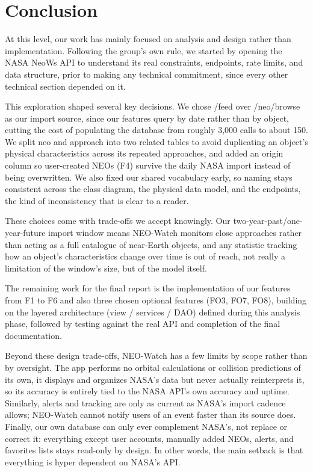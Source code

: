 \section{Conclusion}
At this level, our work has mainly focused on analysis and design rather than implementation. Following the group's own rule, we started by opening the NASA NeoWs API to understand its real constraints, endpoints, rate limits, and data structure, prior to making any technical commitment, since every other technical section depended on it.

\vspace{0.25cm}

This exploration shaped several key decisions. We chose /feed over /neo/browse as our import source, since our features query by date rather than by object, cutting the cost of populating the database from roughly 3,000 calls to about 150. We split neo and approach into two related tables to avoid duplicating an object's physical characteristics across its repeated approaches, and added an origin column so user-created NEOs (F4) survive the daily NASA import instead of being overwritten. We also fixed our shared vocabulary early, so naming stays consistent across the class diagram, the physical data model, and the endpoints, the kind of inconsistency that is clear to a reader.

\vspace{0.25cm}

These choices come with trade-offs we accept knowingly. Our two-year-past/one-year-future import window means NEO-Watch monitors close approaches rather than acting as a full catalogue of near-Earth objects, and any statistic tracking how an object's characteristics change over time is out of reach, not really a limitation of the window's size, but of the model itself.

\vspace{0.25cm}

The remaining work for the final report is the implementation of our features from F1 to F6 and also three chosen optional features (FO3, FO7, FO8), building on the layered architecture (view / services / DAO) defined during this analysis phase, followed by testing against the real API and completion of the final documentation.

\vspace{0.25cm}

Beyond these design trade-offs, NEO-Watch has a few limits by scope rather than by oversight. The app performs no orbital calculations or collision predictions of its own, it displays and organizes NASA's data but never actually reinterprets it, so its accuracy is entirely tied to the NASA API's own accuracy and uptime. Similarly, alerts and tracking are only as current as NASA's import cadence allows; NEO-Watch cannot notify users of an event faster than its source does. Finally, our own database can only ever complement NASA's, not replace or correct it: everything except user accounts, manually added NEOs, alerts, and favorites lists stays read-only by design. In other words, the main setback is that everything is hyper dependent on NASA's API.

